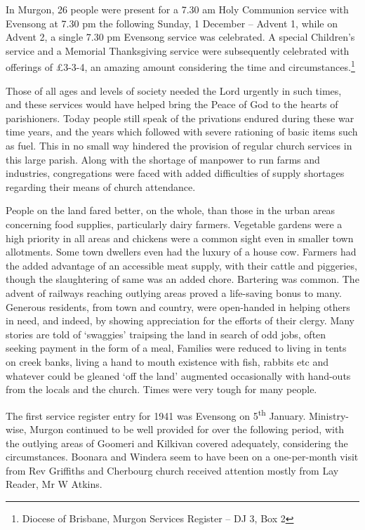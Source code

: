 In Murgon, 26 people were present for a 7.30 am Holy Communion service with Evensong at 7.30 pm the following Sunday, 1 December -- Advent 1, while on Advent 2, a single 7.30 pm Evensong service was celebrated. A special Children's service and a Memorial Thanksgiving service were subsequently celebrated with offerings of \pounds3-3-4, an amazing amount considering the time and circumstances.\footnote{Diocese of Brisbane, Murgon Services Register -- DJ 3, Box 2}


Those of all ages and levels of society needed the Lord urgently in such times, and these services would have helped bring the Peace of God to the hearts of parishioners. Today people still speak of the privations endured during these war time years, and the years which followed with severe rationing of basic items such as fuel. This in no small way hindered the provision of regular church services in this large parish. Along with the shortage of manpower to run farms and industries, congregations were faced with added difficulties of supply shortages regarding their means of church attendance.



People on the land fared better, on the whole, than those in the urban areas concerning food supplies, particularly dairy farmers. Vegetable gardens were a high priority in all areas and chickens were a common sight even in smaller town allotments. Some town dwellers even had the luxury of a house cow. Farmers had the added advantage of an accessible meat supply, with their cattle and piggeries, though the slaughtering of same was an added chore. Bartering was common. The advent of railways reaching outlying areas proved a life-saving bonus to many. Generous residents, from town and country, were open-handed in helping others in need, and indeed, by showing appreciation for the efforts of their clergy. Many stories are told of `swaggies' traipsing the land in search of odd jobs, often seeking payment in the form of a meal, Families were reduced to living in tents on creek banks, living a hand to mouth existence with fish, rabbits etc and whatever could be gleaned `off the land' augmented occasionally with hand-outs from the locals and the church. Times were very tough for many people.



The first service register entry for 1941 was Evensong on 5\textsuperscript{th} January. Ministry-wise, Murgon continued to be well provided for over the following period, with the outlying areas of Goomeri and Kilkivan covered adequately, considering the circumstances. Boonara and Windera seem to have been on a one-per-month visit from Rev Griffiths and Cherbourg church received attention mostly from Lay Reader, Mr W Atkins.



